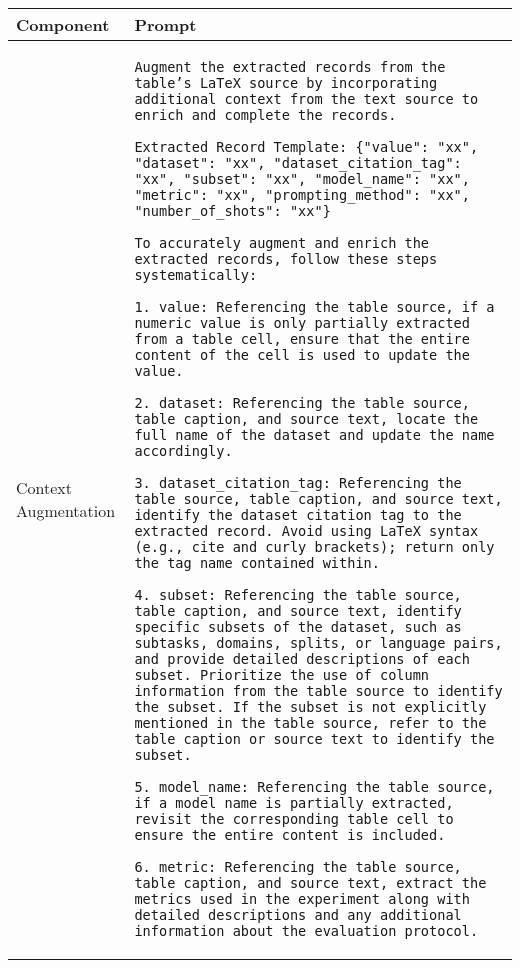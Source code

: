 \begin{table*}[ht]  
    \centering  
    \small
    \renewcommand{\arraystretch}{1.3} 
    \begin{tabular}{p{}|p{}}
    \toprule
    \textbf{Component} & \textbf{Prompt} \\ \midrule  

Context Augmentation & \texttt{Augment the extracted records from the table's LaTeX source by incorporating additional context from the text source to enrich and complete the records.}  

\texttt{Extracted Record Template: \{"value": "xx", "dataset": "xx", "dataset\_citation\_tag": "xx", "subset": "xx", "model\_name": "xx", "metric": "xx", "prompting\_method": "xx", "number\_of\_shots": "xx"\}}  \newline

\texttt{To accurately augment and enrich the extracted records, follow these steps systematically:}  

\texttt{1. value: Referencing the table source, if a numeric value is only partially extracted from a table cell, ensure that the entire content of the cell is used to update the value.}  

\texttt{2. dataset: Referencing the table source, table caption, and source text, locate the full name of the dataset and update the name accordingly.}  

\texttt{3. dataset\_citation\_tag: Referencing the table source, table caption, and source text, identify the dataset citation tag to the extracted record. Avoid using LaTeX syntax (e.g., cite and curly brackets); return only the tag name contained within.}  

\texttt{4. subset: Referencing the table source, table caption, and source text, identify specific subsets of the dataset, such as subtasks, domains, splits, or language pairs, and provide detailed descriptions of each subset. Prioritize the use of column information from the table source to identify the subset. If the subset is not explicitly mentioned in the table source, refer to the table caption or source text to identify the subset.}  

\texttt{5. model\_name: Referencing the table source, if a model name is partially extracted, revisit the corresponding table cell to ensure the entire content is included.}  

\texttt{6. metric: Referencing the table source, table caption, and source text, extract the metrics used in the experiment along with detailed descriptions and any additional information about the evaluation protocol.}  


\end{tabular}
\end{table*}
